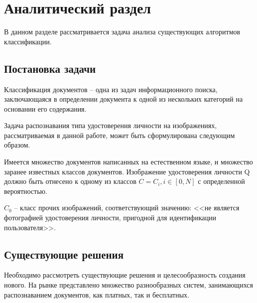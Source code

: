 \chapter{\textbf{Аналитический раздел}}

В данном разделе рассматривается задача анализа существующих алгоритмов классификации.

\section{Постановка задачи}

Классификация документов -- одна из задач информационного поиска, заключающаяся в определении документа к одной из нескольких категорий на основании его содержания. 

Задача распознавания типа удостоверения личности на изображениях, рассматриваемая в данной работе, может быть сформулирована следующим образом. 

Имеется множество документов написанных на естественном языке, и множество заранее известных классов документов. Изображение удостоверения личности Q должно быть отнесено к одному из классов $C=C_i, i \in [0, N]$ с определенной вероятностью.

$C_0$ -- класс прочих изображений, соответствующий значению: <<не является фотографией удостоверения личности, пригодной для идентификации пользователя>>.

\section{Существующие решения}

Необходимо рассмотреть существующие решения и целесообразность создания нового. На рынке представлено множество разнообразных систем, занимающихся распознаванием документов, как платных, так и бесплатных.

